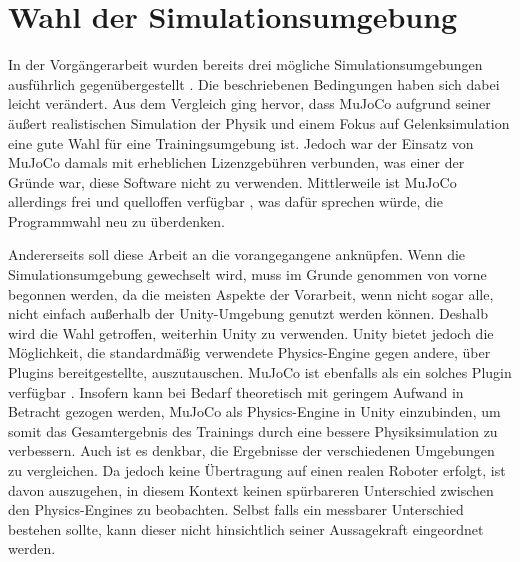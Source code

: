 \section{Wahl der Simulationsumgebung}
In der Vorgängerarbeit wurden bereits drei mögliche Simulationsumgebungen ausführlich gegenübergestellt \cite[27]{waidner.2020}.
Die beschriebenen Bedingungen haben sich dabei leicht verändert.
Aus dem Vergleich ging hervor, dass MuJoCo aufgrund seiner äußert realistischen Simulation der Physik und einem Fokus auf Gelenksimulation eine gute Wahl für eine Trainingsumgebung ist.
Jedoch war der Einsatz von MuJoCo damals mit erheblichen Lizenzgebühren verbunden, was einer der Gründe war, diese Software nicht zu verwenden.
Mittlerweile ist MuJoCo allerdings frei und quelloffen verfügbar \cite{mujoco.org,github.mujoco}, was dafür sprechen würde, die Programmwahl neu zu überdenken.

Andererseits soll diese Arbeit an die vorangegangene anknüpfen.
Wenn die Simulationsumgebung gewechselt wird, muss im Grunde genommen von vorne begonnen werden, da die meisten Aspekte der Vorarbeit, wenn nicht sogar alle, nicht einfach außerhalb der Unity-Umgebung genutzt werden können.
Deshalb wird die Wahl getroffen, weiterhin Unity zu verwenden.
Unity bietet jedoch die Möglichkeit, die standardmäßig verwendete Physics-Engine gegen andere, über Plugins bereitgestellte, auszutauschen.
MuJoCo ist ebenfalls als ein solches Plugin verfügbar \cite{mujocoUnityPlugin}.
Insofern kann bei Bedarf theoretisch mit geringem Aufwand in Betracht gezogen werden, MuJoCo als Physics-Engine in Unity einzubinden, um somit das Gesamtergebnis des Trainings durch eine bessere Physiksimulation zu verbessern.
Auch ist es denkbar, die Ergebnisse der verschiedenen Umgebungen zu vergleichen.
Da jedoch keine Übertragung auf einen realen Roboter erfolgt, ist davon auszugehen, in diesem Kontext keinen spürbareren Unterschied zwischen den Physics-Engines zu beobachten.
Selbst falls ein messbarer Unterschied bestehen sollte, kann dieser nicht hinsichtlich seiner Aussagekraft eingeordnet werden.


